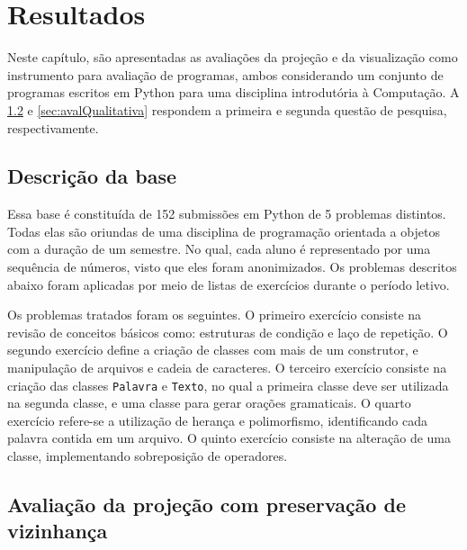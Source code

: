\chapter{Resultados}
\label{chap:resultados}

	Neste capítulo, são apresentadas as avaliações da projeção e da visualização como
	instrumento para avaliação de programas, ambos considerando um conjunto de
	programas escritos em Python para uma disciplina introdutória à Computação. A
	\cref{sec:avalProjecao} e \cref{sec:avalQualitativa} respondem a primeira e
	segunda questão de pesquisa, respectivamente.
	
	
	\section{Descrição da base}
	\label{sec:resultados:base-apoo}

		Essa base é constituída de 152 submissões em Python de 5 problemas distintos.
		Todas elas são oriundas de uma disciplina de programação orientada a objetos
		com a duração de um semestre. No qual, cada aluno é representado por uma
		sequência de números, visto que eles foram anonimizados. Os problemas
		descritos abaixo foram aplicadas por meio de listas de exercícios durante o
		período letivo.
		
		Os problemas tratados foram os seguintes. O primeiro exercício consiste na revisão
		de conceitos básicos como: estruturas de condição e laço de repetição. O segundo
		exercício define a criação de classes com mais de um construtor, e manipulação de
		arquivos e cadeia de caracteres. O terceiro exercício consiste na criação das classes
		\texttt{Palavra} e \texttt{Texto}, no qual a primeira classe deve ser utilizada na segunda
		classe, e uma classe para gerar orações gramaticais. O quarto exercício refere-se a
		utilização de herança e polimorfismo, identificando cada palavra contida em um arquivo. O
		quinto exercício consiste na alteração de uma classe, implementando sobreposição de
		operadores. 
		
	
	\section{Avaliação da projeção com preservação de vizinhança}
	\label{sec:avalProjecao}

